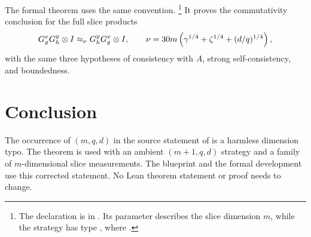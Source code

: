 \documentclass{article}
\begin{document}
The formal theorem uses the same convention.%
\footnote{The declaration is 
in . Its parameter
 describes the slice dimension $m$, while the strategy has
type , where .}
It proves the commutativity conclusion for the full slice products
\[
  G^x_g G^y_h \otimes I \approx_\nu G^y_h G^x_g \otimes I,
  \qquad
  \nu = 30m\left(\gamma^{1/4}+\zeta^{1/4}+(d/q)^{1/4}\right),
\]
with the same three hypotheses of consistency with $A$, strong
self-consistency, and boundedness.

\section{Conclusion}

The occurrence of $(m,q,d)$ in the source statement of
 is a harmless dimension typo. The theorem is used
with an ambient $(m+1,q,d)$ strategy and a family of $m$-dimensional slice
measurements. The blueprint and the formal development use this corrected
statement. No Lean theorem statement or proof needs to change.



\end{document}
